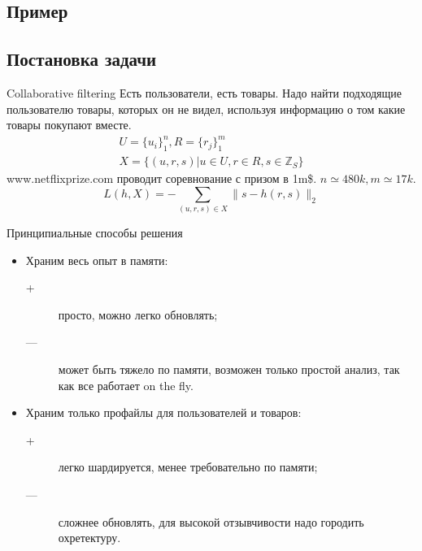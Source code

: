 \documentclass[14pt, fleqn, xcolor={dvipsnames, table}]{beamer}
\begin{document}
\subsection{Пример} %

\subsection{Постановка задачи} %
\begin{frame}{Collaborative filtering}
Есть пользователи, есть товары. Надо найти подходящие пользователю товары, которых он не видел, используя информацию о том какие товары покупают вместе.
$$\begin{array}{l}
U = \{u_i\}_1^n, R = \{r_j\}_1^m \\
X = \{(u, r, s) | u \in U, r \in R, s \in \mathbb{Z}_S \}
\end{array}$$
{\color{blue}www.netflixprize.com} проводит соревнование с призом в 1m\$. $n \simeq 480k, m \simeq 17k$.
$$
L(h, X) = -\sum_{(u,r,s) \in X} \|s - h(r,s)\|_2
$$
\end{frame}

\begin{frame}{Принципиальные способы решения}
\begin{itemize}
  \item Храним весь опыт в памяти:
  \begin{description}
    \item[\color{green}+] просто, можно легко обновлять;
    \item[\color{red}---] может быть тяжело по памяти, возможен только простой анализ, так как все работает on the fly.
  \end{description}
  \item Храним только профайлы для пользователей и товаров:
  \begin{description}
    \item[\color{green}+] легко шардируется, менее требовательно по памяти;
    \item[\color{red}---] сложнее обновлять, для высокой отзывчивости надо городить охретектуру.
  \end{description}
\end{itemize}
\end{frame}
\end{document}

